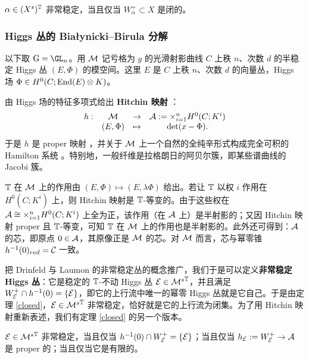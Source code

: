 \begin{theorem}\label{closed}
$\alpha\in (X^s)^{\mathbb{T}}$ 非常稳定，当且仅当 $W_\alpha^+\subset X$ 是闭的。
\end{theorem}

\subsubsection{Higgs 丛的 Białynicki--Birula 分解}

以下取 $\G=\GL_n$。用 ${\mathcal{M}}$ 记亏格为 $g$ 的光滑射影曲线 $C$ 上秩 $n$、次数 $d$ 的半稳定 Higgs 丛 $(E,\Phi)$ 的模空间。这里 $E$ 是 $C$ 上秩 $n$、次数 $d$ 的向量丛，Higgs 场 $\Phi\in H^0(C;\textnormal{End}(E)\otimes K)$。

由 Higgs 场的特征多项式给出 \textbf{Hitchin 映射} \cite{hitchin-stable}：
\[
\begin{array}{cccc}
h: &{\mathcal{M}}&\to& {\mathcal{A}}:=\times_{i=1}^n H^0(C;K^i)\\
 &(E,\Phi)&\mapsto& \det(x-\Phi).
\end{array}
\]
于是 $h$ 是 proper 映射 \cite{hitchin,nitsure,simpson}，并关于 ${\mathcal{M}}$ 上一个自然的全纯辛形式构成完全可积的 Hamilton 系统 \cite{hitchin-stable,faltings}。特别地，一般纤维是拉格朗日的阿贝尔簇，即某些谱曲线的 Jacobi 簇。

${\mathbb{T}}$ 在 ${\mathcal{M}}$ 上的作用由 $(E,\Phi)\mapsto (E,\lambda\Phi)$ 给出。若让 ${\mathbb{T}}$ 以权 $i$ 作用在 $H^0(C;K^i)$ 上，则 Hitchin 映射是 ${\mathbb{T}}$-等变的。由于这些权在 ${\mathcal{A}}\cong \times_{i=1}^n H^0(C;K^i)$ 上全为正，该作用（在 ${\mathcal{A}}$ 上）是半射影的；又因 Hitchin 映射 proper 且 ${\mathbb{T}}$-等变，可知 ${\mathbb{T}}$ 在 ${\mathcal{M}}$ 上的作用也是半射影的。此外还可得到：${\mathcal{A}}$ 的芯，即原点 $0\in {\mathcal{A}}$，其原像正是 ${\mathcal{M}}$ 的芯。对 ${\mathcal{M}}$ 而言，芯与幂零锥 $h^{-1}(0)_{red}={\mathcal C}$ 一致。

把 Drinfeld 与 Laumon \cite{drinfeld2,laumon1} 的非常稳定丛的概念推广，我们于是可以定义\textbf{非常稳定 Higgs 丛}：它是稳定的 ${\mathbb{T}}$-不动 Higgs 丛 ${\mathcal E}\in {{\mathcal{M}}^s}^{\mathbb{T}}$，并且满足 $W^+_{\mathcal E}\cap h^{-1}(0)=\{{\mathcal E}\}$，即它的上行流中唯一的幂零 Higgs 丛就是它自己。于是由定理 \ref{closed}，${\mathcal E}\in {{\mathcal{M}}^s}^{\mathbb{T}}$ 非常稳定，恰好就是它的上行流为闭集。为了用 Hitchin 映射重新表述，我们有定理 \ref{closed} 的另一个版本。

\begin{theorem}\label{proper}
${\mathcal E} \in {{\mathcal{M}}^s}^{\mathbb{T}}$ 非常稳定，当且仅当 $h^{-1}({0})\cap W^+_{\mathcal E}=\{{\mathcal E}\}$；当且仅当 $h_{\mathcal E}:=W_{\mathcal E}^+\to {\mathcal{A}}$ 是 proper 的；当且仅当它是有限的。
\end{theorem}

